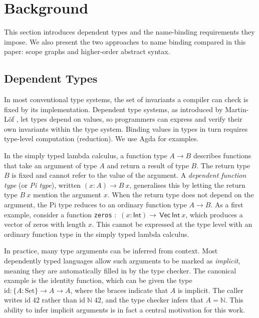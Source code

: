 \section{\label{sec:statix}Background}

This section introduces dependent types and the name-binding requirements they
impose. We also present the two approaches to name binding compared in this paper:
scope graphs and higher-order abstract syntax.

\subsection{Dependent Types}
In most conventional type systems, the set of invariants a compiler can check is
fixed by its implementation. Dependent type systems, as introduced by
Martin-L{\"o}f \autocite{martinlof1984intuitionistic}, let types depend on
values, so programmers can express and verify their own invariants within the
type system. Binding values in types in turn requires type-level computation
(reduction). We use Agda \autocite{norell2007practical} for examples.

In the simply typed lambda calculus, a function type $A \to B$ describes functions that
take an argument of type $A$ and return a result of type $B$. The return type
$B$ is fixed and cannot refer to the value of the argument. A \emph{dependent
  function type} (or \emph{Pi type}), written $(x : A) \rightarrow B \ x$, generalises this by letting the return type $B \ x$ mention the argument $x$. When the return type does not depend on the argument, the Pi type reduces to an ordinary function type $A \to B$. As a first example, consider a function \texttt{zeros} : $\,(x : \mathsf{Int}) \rightarrow \, \mathsf{Vec} \  \mathsf{Int} \ x$, which produces a vector of zeros with length $x$. This cannot be expressed at the type level with an ordinary function type in the simply typed lambda calculus. 

In practice, many type arguments can be inferred from context. Most dependently typed languages allow such arguments to be marked as \emph{implicit}, meaning they are automatically filled in by the type checker. The canonical example is the identity function, which can be given the type $\text{id} : \{A : \text{Set}\} \to A \to A$, where the braces indicate that $A$ is implicit. The caller writes $\text{id}\; 42$ rather than
$\text{id}\; \mathbb{N}\; 42$, and the type checker infers that $A = \mathbb{N}$. This ability to infer implicit arguments is in fact a central motivation for this work. 

